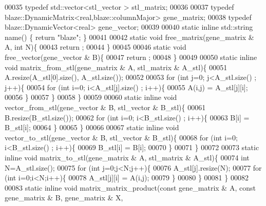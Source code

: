 \begin{DoxyCode}
00035   \textcolor{keyword}{typedef} std::vector<stl\_vector > stl\_matrix;
00036 
00037   \textcolor{keyword}{typedef} blaze::DynamicMatrix<real,blaze::columnMajor>  gene\_matrix;
00038   \textcolor{keyword}{typedef} blaze::DynamicVector<real>  gene\_vector;
00039 
00040   \textcolor{keyword}{static} \textcolor{keyword}{inline} std::string name() \{ \textcolor{keywordflow}{return} \textcolor{stringliteral}{"blaze"}; \}
00041 
00042   \textcolor{keyword}{static} \textcolor{keywordtype}{void} free\_matrix(gene\_matrix & A, \textcolor{keywordtype}{int} N)\{
00043     return ;
00044   \}
00045 
00046   \textcolor{keyword}{static} \textcolor{keywordtype}{void} free\_vector(gene\_vector & B)\{
00047     return ;
00048   \}
00049 
00050   \textcolor{keyword}{static} \textcolor{keyword}{inline} \textcolor{keywordtype}{void} matrix\_from\_stl(gene\_matrix & A, stl\_matrix & A\_stl)\{
00051     A.resize(A\_stl[0].size(), A\_stl.size());
00052 
00053     \textcolor{keywordflow}{for} (\textcolor{keywordtype}{int} j=0; j<A\_stl.size() ; j++)\{
00054       \textcolor{keywordflow}{for} (\textcolor{keywordtype}{int} i=0; i<A\_stl[j].size() ; i++)\{
00055         A(i,j) = A\_stl[j][i];
00056       \}
00057     \}
00058   \}
00059 
00060   \textcolor{keyword}{static} \textcolor{keyword}{inline} \textcolor{keywordtype}{void} vector\_from\_stl(gene\_vector & B, stl\_vector & B\_stl)\{
00061     B.resize(B\_stl.size());
00062     \textcolor{keywordflow}{for} (\textcolor{keywordtype}{int} i=0; i<B\_stl.size() ; i++)\{
00063       B[i] = B\_stl[i];
00064     \}
00065   \}
00066 
00067   \textcolor{keyword}{static} \textcolor{keyword}{inline} \textcolor{keywordtype}{void} vector\_to\_stl(gene\_vector & B, stl\_vector & B\_stl)\{
00068     \textcolor{keywordflow}{for} (\textcolor{keywordtype}{int} i=0; i<B\_stl.size() ; i++)\{
00069       B\_stl[i] = B[i];
00070     \}
00071   \}
00072 
00073   \textcolor{keyword}{static} \textcolor{keyword}{inline} \textcolor{keywordtype}{void} matrix\_to\_stl(gene\_matrix & A, stl\_matrix & A\_stl)\{
00074     \textcolor{keywordtype}{int} N=A\_stl.size();
00075     \textcolor{keywordflow}{for} (\textcolor{keywordtype}{int} j=0;j<N;j++)\{
00076       A\_stl[j].resize(N);
00077       \textcolor{keywordflow}{for} (\textcolor{keywordtype}{int} i=0;i<N;i++)\{
00078         A\_stl[j][i] = A(i,j);
00079       \}
00080     \}
00081   \}
00082 
00083   \textcolor{keyword}{static} \textcolor{keyword}{inline} \textcolor{keywordtype}{void} matrix\_matrix\_product(\textcolor{keyword}{const} gene\_matrix & A, \textcolor{keyword}{const} gene\_matrix & B, gene\_matrix & X, \textcolor{keywordtype}{
}
\end{DoxyCode}
